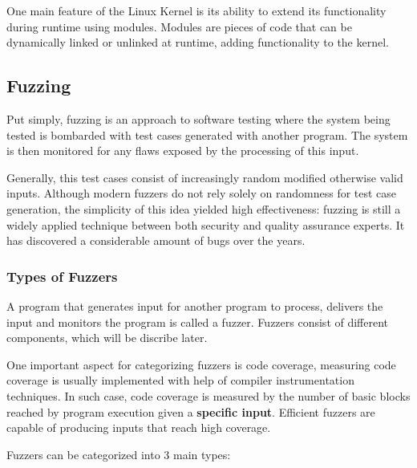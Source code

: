 One main feature of the Linux Kernel is its ability to extend its functionality during runtime using
modules. Modules are pieces of code that can be dynamically linked or unlinked at runtime,
adding functionality to the kernel\cite{korbethLinuxDeviceDrivers2005}.


\subsection{Fuzzing}

Put simply, fuzzing is an approach to software testing where the system being tested is bombarded with test cases generated with another program. The system is then monitored for any flaws exposed by the processing of
this input\cite{mcnallyFuzzingStateArt2012}.

Generally, this test cases consist of increasingly random modified otherwise valid inputs. Although modern
fuzzers do not rely solely on randomness for test case generation, the simplicity of this idea yielded high
effectiveness: fuzzing is still a widely applied technique between both security and quality assurance experts.
It has discovered a considerable amount of bugs over the years.

\subsubsection{Types of Fuzzers}

A program that generates input for another program to process, delivers the input and monitors the program
is called a fuzzer. Fuzzers consist of different components, which will be discribe later.

One important aspect for categorizing fuzzers is code coverage, measuring code coverage is usually implemented
with help of compiler instrumentation techniques. In such case, code coverage is measured by the number of
basic blocks reached by program execution given a \textbf{specific input}. Efficient fuzzers are capable of producing inputs that reach high coverage.

Fuzzers can be categorized into 3 main types:

